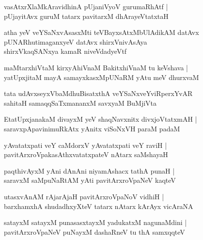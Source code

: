 \documentclass[twoside,12pt,openright]{book}
\newcounter{shloka}[chapter]
\begin{document}
\begin{shloka}%
vasAtxrXlaMkAravidhinA pUjaniVyoV gurumaRhAtf |\\
pUjayitAvx guruM tatarx pavitarxM dhArayeVtatxtaH 
\end{shloka}

\begin{shloka}%
atha yeV veYSaNxvAsasxMti teVBayxsAtxMbUlAdikAM datAvx \\
pUNARhutimaganxyeV datAvx shirxVnivAsAya \\
shirxVkaqSANxya kamaR niveVdadyeVtf
\end{shloka}

\begin{shloka}%
maMtarxhiVtaM kirxyAhiVnaM BakitxhiVnaM tu keVshava |\\
yatUpxjitaM mayA samayxkasxMpUNaRM yAtu meV dhurxvaM 
\end{shloka}

\begin{shloka}%
tata udAvxseyxVbaMdhuBisatxthA veYSaNxveYviRperxYvAR \\
sahitaH samaqqSaTxmananxM savxyaM BuMjiVta
\end{shloka}

\begin{shloka}%
EtatUpxjanakaM divayxM yeV shaqNavxnitx divxjoVtatxmAH |\\
saravxpApavinimuRkAtx yAnitx viSoNxVH paraM padaM 
\end{shloka}

\begin{shloka}%
yAvatatxpati veY caMdorxV yAvatatxpati veY raviH |\\
pavitArxroVpakasAthxvatatxpateV nAtarx saMshayaH 
\end{shloka}

\begin{shloka}%
paqthivAyxM yAni dAnAni niyamAshacx tathA punaH |\\
saravxM saMpuNaRtAM yAti pavitArxroVpaNeV kaqteV
\end{shloka}

\begin{shloka}%
utasxvAnAM rAjarAjaH pavitArxroVpaNoV vidhiH |\\
barxhamxhA shudadhxyXteV tatarx nAtarx kArAyx vicAraNA
\end{shloka}

\begin{shloka}%
satayxM satayxM punasasxtayxM yadukatxM nagunaMdini |\\
pavitArxroVpaNeV puNayxM dashaRneV tu thA samxqqteV 
\end{shloka}
\end{document}
